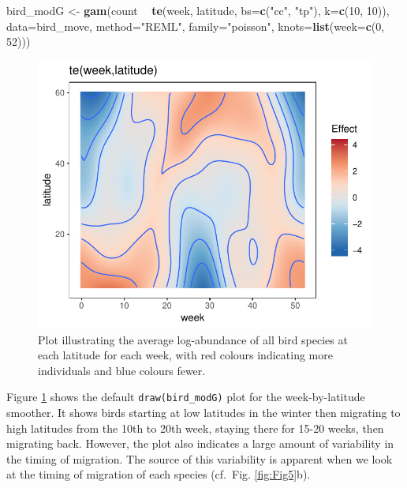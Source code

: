 \documentclass[12pt]{article}
\newenvironment{Shaded}{\begin{snugshade}}{\end{snugshade}}
\newcommand{\KeywordTok}[1]{\textcolor[rgb]{0.13,0.29,0.53}{\textbf{#1}}}
\newcommand{\DataTypeTok}[1]{\textcolor[rgb]{0.13,0.29,0.53}{#1}}
\newcommand{\DecValTok}[1]{\textcolor[rgb]{0.00,0.00,0.81}{#1}}
\newcommand{\StringTok}[1]{\textcolor[rgb]{0.31,0.60,0.02}{#1}}
\newcommand{\OperatorTok}[1]{\textcolor[rgb]{0.81,0.36,0.00}{\textbf{#1}}}
\newcommand{\NormalTok}[1]{#1}
\begin{document}
\begin{Shaded}
\begin{Highlighting}[]
\NormalTok{bird_modG <-}\StringTok{ }\KeywordTok{gam}\NormalTok{(count }\OperatorTok{~}\StringTok{ }\KeywordTok{te}\NormalTok{(week, latitude, }\DataTypeTok{bs=}\KeywordTok{c}\NormalTok{(}\StringTok{"cc"}\NormalTok{, }\StringTok{"tp"}\NormalTok{), }\DataTypeTok{k=}\KeywordTok{c}\NormalTok{(}\DecValTok{10}\NormalTok{, }\DecValTok{10}\NormalTok{)),}
                 \DataTypeTok{data=}\NormalTok{bird_move, }\DataTypeTok{method=}\StringTok{"REML"}\NormalTok{, }\DataTypeTok{family=}\StringTok{"poisson"}\NormalTok{,}
                 \DataTypeTok{knots=}\KeywordTok{list}\NormalTok{(}\DataTypeTok{week=}\KeywordTok{c}\NormalTok{(}\DecValTok{0}\NormalTok{, }\DecValTok{52}\NormalTok{)))}
\end{Highlighting}
\end{Shaded}

\begin{figure}
\centering
\includegraphics{../figures/Fig8.pdf}
\caption{\label{fig:Fig8}Plot illustrating the average log-abundance of
all bird species at each latitude for each week, with red colours
indicating more individuals and blue colours fewer.}
\end{figure}

Figure \ref{fig:Fig8} shows the default \texttt{draw(bird\_modG)} plot
for the week-by-latitude smoother. It shows birds starting at low
latitudes in the winter then migrating to high latitudes from the 10th
to 20th week, staying there for 15-20 weeks, then migrating back.
However, the plot also indicates a large amount of variability in the
timing of migration. The source of this variability is apparent when we
look at the timing of migration of each species (cf.~Fig.
\ref{fig:Fig5}b).
\end{document}
